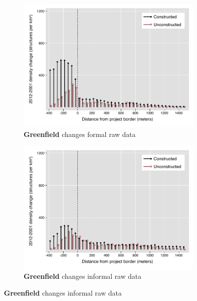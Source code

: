 \documentclass[12pt]{article}
\begin{document}
\begin{figure}
\begin{subfigure}[b]{0.48\textwidth}
        \end{subfigure}
        \begin{subfigure}[b]{0.48\textwidth}
                    \caption[Network2]%
            {{\footnotesize \textbf{Greenfield} changes formal  raw data}}    
            \label{fig:prefor}
            \centering
            \includegraphics[width=\textwidth,trim={0.3cm .3cm 0.1cm 0cm}, clip=true]{figures/bblu_for_rawchanges_4_1_spk.pdf}

        \end{subfigure}
        \hfill
        \begin{subfigure}[b]{0.48\textwidth}  
                    \caption[]%
            {{\footnotesize \textbf{Greenfield} changes informal raw data }}     
            \label{fig:preinf}
            \centering 
            \includegraphics[width=\textwidth,trim={0.3cm .3cm 0.1cm 0cm}, clip=true]{figures/bblu_inf_rawchanges_4_1_spk.pdf}


\end{subfigure}
\end{figure}
\end{document}
